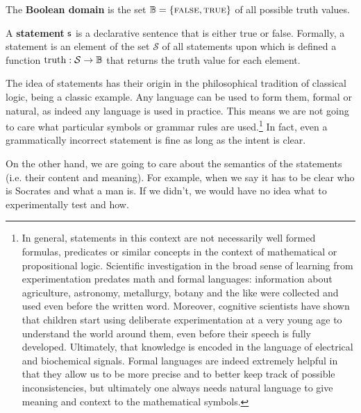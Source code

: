 \documentclass[11pt,letterpaper,fleqn]{memoir} %
\begin{document}
\begin{mathSection}
\begin{defn}
	The \textbf{Boolean domain} is the set $\mathbb{B} = \{\textsc{false}, \textsc{true}\}$ of all possible truth values.
\end{defn}


\begin{axiom}\label{def_statement}
	A \textbf{statement} $\mathsf{s}$ is a declarative sentence that is either true or false. Formally, a statement is an element of the set $\mathcal{S}$ of all statements upon which is defined a function $\operatorname{truth}: \mathcal{S} \to \mathbb{B}$ that returns the truth value for each element.
\end{axiom}

\end{mathSection}

The idea of statements has their origin in the philosophical tradition of classical logic,  being a classic example. Any language can be used to form them, formal or natural, as indeed any language is used in practice. This means we are not going to care what particular symbols or grammar rules are used.\footnote{In general, statements in this context are not necessarily well formed formulas, predicates or similar concepts in the context of mathematical or propositional logic. Scientific investigation in the broad sense of learning from experimentation predates math and formal languages: information about agriculture, astronomy, metallurgy, botany and the like were collected and used even before the written word. Moreover, cognitive scientists have shown that children start using deliberate experimentation at a very young age to understand the world around them, even before their speech is fully developed. Ultimately, that knowledge is encoded in the language of electrical and biochemical signals. Formal languages are indeed extremely helpful in that they allow us to be more precise and to better keep track of possible inconsistencies, but ultimately one always needs natural language to give meaning and context to the mathematical symbols.} In fact, even a grammatically incorrect statement is fine as long as the intent is clear.

On the other hand, we are going to care about the semantics of the statements (i.e. their content and meaning). For example, when we say  it has to be clear who is Socrates and what a man is. If we didn't, we would have no idea what to experimentally test and how.
\end{document}
